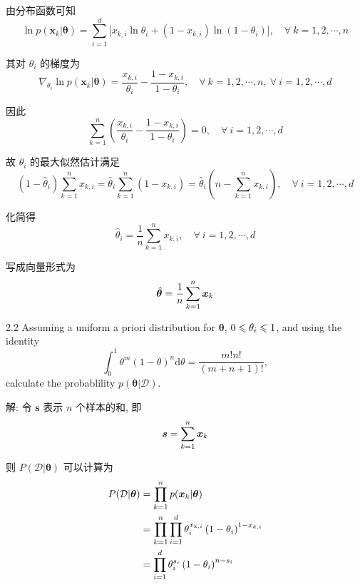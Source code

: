 \documentclass{article}
\begin{document}
由分布函数可知
\begin{equation}
  \ln p(\bm{x}_k|\bm{\theta})=\sum_{i=1}^d\big[x_{k,i}\ln\theta_i+(1-x_{k,i})\ln(1-\theta_i)\big],\quad\forall~k=1,2,\cdots,n
\end{equation}

其对 $\theta_i$ 的梯度为
\begin{equation}
  \nabla_{\theta_i}\ln p(\bm{x}_k|\bm{\theta})=\frac{x_{k,i}}{\theta_i}-\frac{1-x_{k,i}}{1-\theta_i},\quad\forall~k=1,2,\cdots,n,~\forall~i=1,2,\cdots,d
\end{equation}

因此
\begin{equation}
  \sum_{k=1}^n\left(\frac{x_{k,i}}{\theta_i}-\frac{1-x_{k,i}}{1-\theta_i}\right)=0,\quad\forall~i=1,2,\cdots,d
\end{equation}

故 $\theta_i$ 的最大似然估计满足
\begin{equation}
  (1-\hat{\theta}_i)\sum_{k=1}^nx_{k,i}=\hat{\theta}_i\sum_{k=1}^n(1-x_{k,i})=\hat{\theta}_i\left(n-\sum_{k=1}^nx_{k,i}\right),\quad\forall~i=1,2,\cdots,d
\end{equation}

化简得
\begin{equation}
  \hat{\theta}_i=\frac{1}{n}\sum_{k=1}^nx_{k,i},\quad\forall~i=1,2,\cdots,d
\end{equation}

写成向量形式为
\begin{equation}
  \hat{\bm{\theta}}=\frac{1}{n}\sum_{k=1}^n\bm{x}_k
\end{equation}

2.2 Assuming a uniform a priori distribution for $\bm{\theta}$, $0 \leqslant {\theta}_i \leqslant 1$, and using the identity
\begin{equation}
  \int_{0}^{1} \theta^{m}(1-\theta)^{n} \mathrm{d}\theta=\frac{m ! n !}{(m+n+1) !},
\end{equation}
calculate the probablility $p(\bm{\theta}|\mathcal{D})$.

解: 令 $\bm{s}$ 表示 $n$ 个样本的和, 即
\begin{equation}
  \bm{s}=\sum_{k=1}^n\bm{x}_k
\end{equation}

则 $P(\mathcal{D}|\bm{\theta})$ 可以计算为
\begin{equation}
  \begin{aligned}
    P(\mathcal{D}|\bm{\theta})
    &=\prod_{k=1}^np(\bm{x}_k|\bm{\theta})\\
    &=\prod_{k=1}^n\prod_{i=1}^d \theta_{i}^{x_{k,i}}\left(1-\theta_{i}\right)^{1-x_{k,i}}\\
    &=\prod_{i=1}^d\theta_{i}^{s_{i}}\left(1-\theta_{i}\right)^{n-s_{i}}\\
  \end{aligned}
\end{equation}
\end{document}
